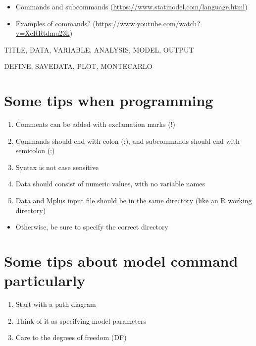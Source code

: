 \documentclass[
]{book}
\providecommand{\tightlist}{%
  \setlength{\itemsep}{0pt}\setlength{\parskip}{0pt}}
\begin{document}
\begin{itemize}
\item
  Commands and subcommands (\url{https://www.statmodel.com/language.html})
\item
  Examples of commands? (\url{https://www.youtube.com/watch?v=XeRRtdmu23k})
\end{itemize}

TITLE, DATA, VARIABLE, ANALYSIS, MODEL, OUTPUT

DEFINE, SAVEDATA, PLOT, MONTECARLO

\hypertarget{some-tips-when-programming}{%
\section{Some tips when programming}\label{some-tips-when-programming}}

\begin{enumerate}
\def\labelenumi{\arabic{enumi}.}
\item
  Comments can be added with exclamation marks (!)
\item
  Commands should end with colon (:), and subcommands should end with semicolon (;)
\item
  Syntax is not case sensitive
\item
  Data should consist of numeric values, with no variable names
\item
  Data and Mplus input file should be in the same directory (like an R working directory)
\end{enumerate}

\begin{itemize}
\tightlist
\item
  Otherwise, be sure to specify the correct directory
\end{itemize}

\hypertarget{some-tips-about-model-command-particularly}{%
\section{Some tips about model command particularly}\label{some-tips-about-model-command-particularly}}

\begin{enumerate}
\def\labelenumi{\arabic{enumi}.}
\item
  Start with a path diagram
\item
  Think of it as specifying model parameters
\item
  Care to the degrees of freedom (DF)
\end{enumerate}
\end{document}
